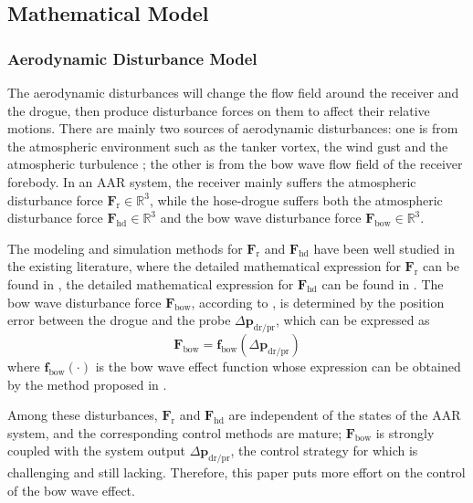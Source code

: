 \subsection{Mathematical Model}

\subsubsection{Aerodynamic Disturbance Model}

The aerodynamic disturbances will change the flow field around the
receiver and the drogue, then produce disturbance forces on them to
affect their relative motions. There are mainly two sources of aerodynamic
disturbances: one is from the atmospheric environment such as the
tanker vortex, the wind gust and the atmospheric turbulence \cite{Vortex-1};
the other is from the bow wave flow field of the receiver forebody.
In an AAR system, the receiver mainly suffers the atmospheric disturbance
force {$\mathbf{F}$}$_{\text{r}}\in%
\mathbb{R}%
^{3}$, while the hose-drogue suffers both the atmospheric disturbance force
{$\mathbf{F}$}${_{\text{hd}}}\in%
\mathbb{R}%
^{3}$ and the bow wave disturbance force {$\mathbf{F}$}$_{\text{bow}}\in%
\mathbb{R}%
^{3}$.

The modeling and simulation methods for {$\mathbf{F}$}$_{\text{r}}$
and {$\mathbf{F}$}${_{\text{hd}}}$ have been well studied in the
existing literature, where the detailed mathematical expression for
{$\mathbf{F}$}$_{\text{r}}$ can be found in \cite{Vortex-1},
the detailed mathematical expression for {$\mathbf{F}$}${_{\text{hd}}}$
can be found in \cite{dai2016modeling}\cite{Vortex-1}. The bow wave
disturbance force {$\mathbf{F}$}$_{\text{bow}}$, according to
\cite{dai2016modeling}, is determined by the position error between
the drogue and the probe $\Delta{\mathbf{p}}_{\text{dr/pr}}$, which
can be expressed as
\begin{equation}
{\mathbf{F}}_{\text{bow}}{=\mathbf{f}}_{\text{bow}}\left(\Delta{\mathbf{p}}_{\text{dr/pr}}\right)\label{Eq-1-3}
\end{equation}
where ${\mathbf{f}}_{\text{bow}}\left(\cdot\right)$ is the bow wave
effect function whose expression can be obtained by the method proposed
in \cite{dai2016modeling}.

Among these disturbances, {$\mathbf{F}$}$_{\text{r}}$ and {$\mathbf{F}$}${_{\text{hd}}}$
are independent of the states of the AAR system, and the corresponding
control methods are mature; {$\mathbf{F}$}$_{\text{bow}}$ is strongly
coupled with the system output $\Delta{\mathbf{p}}_{\text{dr/pr}}$,
the control strategy for which is challenging and still lacking. Therefore,
this paper puts more effort on the control of the bow wave effect.

